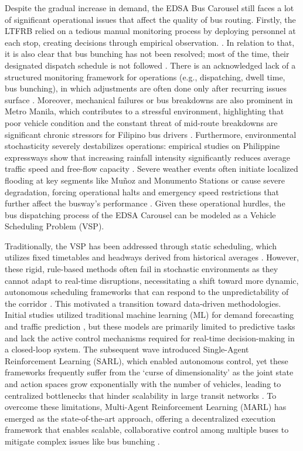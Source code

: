 Despite the gradual increase in demand, the EDSA Bus Carousel still faces a lot of significant operational issues that affect the quality of bus routing. Firstly, the LTFRB relied on a tedious manual monitoring process by deploying personnel at each stop, creating decisions through empirical observation. \cite{EDSApolicy2023}. In relation to that, it is also clear that bus bunching has not been resolved; most of the time, their designated dispatch schedule is not followed \cite{Ollero2024EDSA}. There is an acknowledged lack of a structured monitoring framework for operations (e.g., dispatching, dwell time, bus bunching), in which adjustments are often done only after recurring issues surface \cite{Tiglao2025}. Moreover, mechanical failures or bus breakdowns are also prominent in Metro Manila, which contributes to a stressful environment, highlighting that poor vehicle condition and the constant threat of mid-route breakdowns are significant chronic stressors for Filipino bus drivers \cite{Chua2026}. Furthermore, environmental stochasticity severely destabilizes operations: empirical studies on Philippine expressways show that increasing rainfall intensity significantly reduces average traffic speed and free-flow capacity \cite{TSSP_Rain2018}. Severe weather events often initiate localized flooding at key segments like Muñoz and Monumento Stations or cause severe degradation, forcing operational halts and emergency speed restrictions that further affect the busway’s performance  \cite{PhilstarTyphoon2024, PIA_Emergency2023, BusRepair2023}. Given these operational hurdles, the bus dispatching process of the EDSA Carousel can be modeled as a Vehicle Scheduling Problem (VSP).

Traditionally, the VSP has been addressed through static scheduling, which utilizes fixed timetables and headways derived from historical averages \cite{Ceder2007}. However, these rigid, rule-based methods often fail in stochastic environments as they cannot adapt to real-time disruptions, necessitating a shift toward more dynamic, autonomous scheduling frameworks that can respond to the unpredictability of the corridor \cite{Ollero2024EDSA}. This motivated a transition toward data-driven methodologies. Initial studies utilized traditional machine learning (ML) for demand forecasting and traffic prediction \cite{Wang2017}, but these models are primarily limited to predictive tasks and lack the active control mechanisms required for real-time decision-making in a closed-loop system. The subsequent wave introduced Single-Agent Reinforcement Learning (SARL), which enabled autonomous control, yet these frameworks frequently suffer from the `curse of dimensionality' as the joint state and action spaces grow exponentially with the number of vehicles, leading to centralized bottlenecks that hinder scalability in large transit networks \cite{Chen2024Survey}. To overcome these limitations, Multi-Agent Reinforcement Learning (MARL) has emerged as the state-of-the-art approach, offering a decentralized execution framework that enables scalable, collaborative control among multiple buses to mitigate complex issues like bus bunching \cite{Wang2020Holding}.

